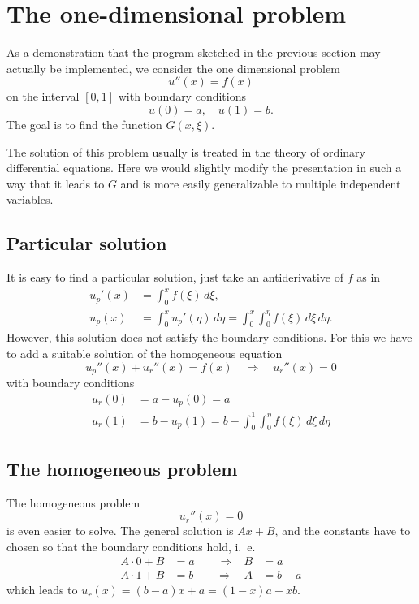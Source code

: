 %
%
%
\section{The one-dimensional problem}
As a demonstration that the program sketched in the previous section
may actually be implemented, we consider the one dimensional problem
\[
u''(x)=f(x)
\]
on the interval $[0,1]$ with boundary conditions
\[
u(0)=a,\quad u(1)=b.
\]
The goal is to find the function $G(x,\xi)$.

The solution of this problem usually is treated in the theory of
ordinary differential equations.
Here we would slightly modify the presentation in such a way
that it leads to $G$ and is more easily generalizable to 
multiple independent variables.

\subsection{Particular solution}
It is easy to find a particular solution, just take an antiderivative
of $f$ as in
\begin{align*}
u_p'(x)&=\int_0^xf(\xi)\,d\xi,
\\
u_p(x)&=\int_0^xu_p'(\eta)\,d\eta=\int_0^x\int_0^\eta f(\xi)\,d\xi\,d\eta.
\end{align*}
However, this solution does not satisfy the boundary conditions.
For this we have to add a suitable solution of the homogeneous
equation
\[
u_p''(x) + u_r''(x)=f(x)\quad\Rightarrow\quad u_r''(x)=0
\]
with boundary conditions
\begin{align*}
u_r(0)&=a-u_p(0)=a\\
u_r(1)&=b-u_p(1)=b-\int_0^1\int_0^\eta f(\xi)\,d\xi\,d\eta
\end{align*}

\subsection{The homogeneous problem}
The homogeneous problem
\[
u_r''(x)=0
\]
is even easier to solve.
The general solution is $Ax+B$, and the constants have to chosen
so that the boundary conditions hold, i.~e.
\[
\begin{aligned}
A\cdot 0+B&=a\qquad\Rightarrow&B&=a\\
A\cdot 1+B&=b\qquad\Rightarrow&A&=b-a
\end{aligned}
\]
which leads to $u_r(x)=(b-a)x+a=(1-x)a+xb$.

